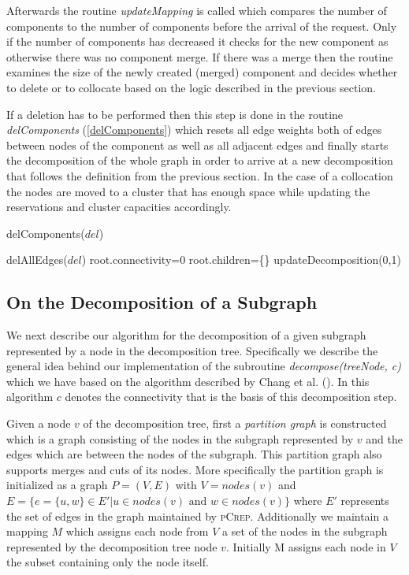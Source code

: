 \documentclass[a4paper,UKenglish,cleveref, autoref, thm-restate,authorcolumns]{lipics-v2019}
\newcommand{\adjDel}{\textsc{pCrep}}
\begin{document}
Afterwards the routine \textit{updateMapping} is called which compares the number of components to the number of components before the arrival of the request. Only if the number of components has decreased it checks for the new component as otherwise there was no component merge. 
If there was a merge then the routine examines the size of the newly created (merged) component and decides whether to delete or to collocate based on the logic described in the previous section.

If a deletion has to be performed then this step is done in the routine \textit{delComponents} (\cref{delComponents}) which resets all edge weights both of edges between nodes of the component as well as all adjacent edges and finally starts the decomposition of the whole graph in order to arrive at a new decomposition that follows the definition from the previous section.
In the case of a collocation the nodes are moved to a cluster that has enough space while updating the reservations and cluster capacities accordingly.



\begin{algorithm}
	\caption{delComponents($del$)}
	\label{delComponents}
	\begin{algorithmic}
		\STATE delAllEdges($del$)
		\STATE root.connectivity=0
		\STATE root.children=\{\}
		\STATE updateDecomposition(0,1)
	\end{algorithmic}
\end{algorithm}

\subsection{On the Decomposition of a Subgraph}
\label{decomp_desc}

We next describe our algorithm for the decomposition of a given subgraph represented by a node in the decomposition tree. Specifically we describe the general idea behind our implementation of the subroutine \textit{decompose(treeNode, c)} which we have based on the algorithm described by Chang et al. (\cite{Chang2013}). In this algorithm $c$ denotes the connectivity that is the basis of this decomposition step.

Given a node $v$ of the decomposition tree, first a \textit{partition graph} is constructed which is a graph consisting of the nodes in the subgraph represented by $v$ and the edges which are between the nodes of the subgraph. This partition graph also supports merges and cuts of its nodes. More specifically the partition graph is initialized as a graph $P=(V,E)$ with $V=nodes(v)$ and $E=\{e=\{u,w\}\in E'|u\in nodes(v)\text{ and }w\in nodes(v)\}$ where $E'$ represents the set of edges in the graph maintained by \adjDel{}. Additionally we maintain a mapping $M$ which assigns each node from $V$ a set of the nodes in the subgraph represented by the decomposition tree node $v$. Initially M assigns each node in $V$ the subset containing only the node itself.
\end{document}
